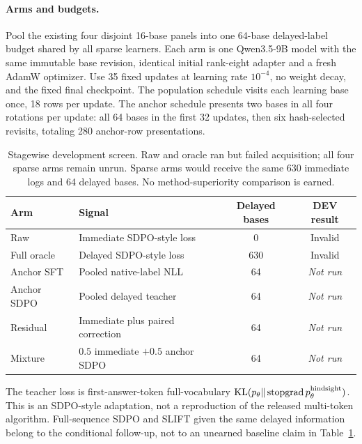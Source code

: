\documentclass{article}
\newcommand{\pending}{\textit{Not run}}
\begin{document}
\paragraph{Arms and budgets.}
Pool the existing four disjoint 16-base panels into one 64-base delayed-label
budget shared by all sparse learners. Each arm is one Qwen3.5-9B model with
the same immutable base revision, identical initial rank-eight adapter and a
fresh AdamW optimizer. Use 35 fixed updates at learning rate $10^{-4}$, no
weight decay, and the fixed final checkpoint. The population schedule visits
each learning base once, 18 rows per update. The anchor schedule presents two
bases in all four rotations per update: all 64 bases in the first 32 updates,
then six hash-selected revisits, totaling 280 anchor-row presentations.

\begin{table}[t]
\centering\small
\begin{tabularx}{\linewidth}{lXcc}
\toprule
Arm & Signal & Delayed bases & DEV result \\
\midrule
Raw & Immediate SDPO-style loss & 0 & Invalid \\
Full oracle & Delayed SDPO-style loss & 630 & Invalid \\
Anchor SFT & Pooled native-label NLL & 64 & \pending \\
Anchor SDPO & Pooled delayed teacher & 64 & \pending \\
Residual & Immediate plus paired correction & 64 & \pending \\
Mixture & $0.5$ immediate $+0.5$ anchor SDPO & 64 & \pending \\
\bottomrule
\end{tabularx}
\caption{Stagewise development screen. Raw and oracle ran but failed acquisition;
all four sparse arms remain unrun. Sparse arms would receive the same 630
immediate logs and 64 delayed bases. No method-superiority comparison is earned.}
\label{tab:neural}
\end{table}

The teacher loss is first-answer-token full-vocabulary
$\mathrm{KL}(p_\theta\Vert\operatorname{stopgrad}p_\theta^{\rm hindsight})$.
This is an SDPO-style adaptation, not a reproduction of the released
multi-token algorithm. Full-sequence SDPO and SLIFT given the same delayed
information belong to the conditional follow-up, not to an unearned baseline
claim in Table~\ref{tab:neural}.
\end{document}
